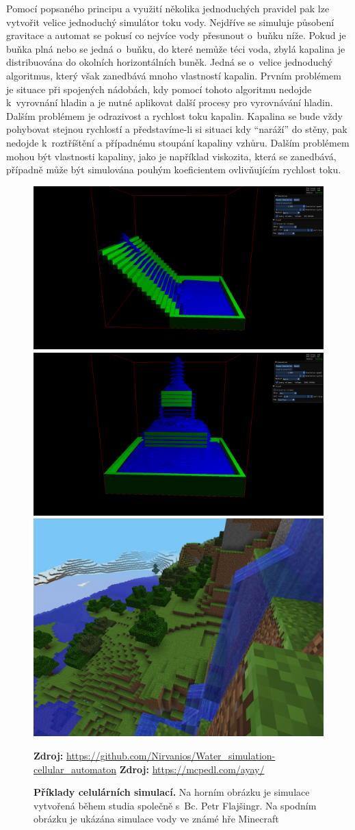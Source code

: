 Pomocí popsaného principu a využití několika jednoduchých pravidel pak lze vytvořit velice jednoduchý simulátor toku vody. Nejdříve se simuluje působení gravitace a automat se pokusí co nejvíce vody přesunout o~buňku níže. Pokud je buňka plná nebo se jedná o~buňku, do které nemůže téci voda, zbylá kapalina je distribuována do okolních horizontálních buněk. Jedná se o~velice jednoduchý algoritmus, který však zanedbává mnoho vlastností kapalin. Prvním problémem je situace při spojených nádobách, kdy pomocí tohoto algoritmu nedojde k~vyrovnání hladin a je nutné aplikovat další procesy pro vyrovnávání hladin. Dalším problémem je odrazivost a rychlost toku kapalin. Kapalina se bude vždy pohybovat stejnou rychlostí a představíme-li si situaci kdy \enquote{naráží} do stěny, pak nedojde k~roztříštění a případnému stoupání kapaliny vzhůru. Dalším problémem mohou být vlastnosti kapaliny, jako je například viskozita, která se zanedbává, případně může být simulována pouhým koeficientem ovlivňujícím rychlost toku. \cite{Medvecky-Heretik2018thesis}

\begin{figure}[h!]\centering
	\centering
	\captionsetup{justification=centering}
	\includegraphics[width=0.5\linewidth]{obrazky-figures/cellular1.png}\hfill
	\includegraphics[width=0.5\linewidth]{obrazky-figures/cellular2.png}\hfill
	\includegraphics[width=0.5\linewidth]{obrazky-figures/miecraft.jpg}\hfill
	\caption{\textbf{Příklady celulárních simulací.} Na horním obrázku je simulace vytvořená během studia společně s~Bc. Petr Flajšingr. Na spodním obrázku je ukázána simulace vody ve známé hře Minecraft}
	\textbf{Zdroj: } \url{https://github.com/Nirvanios/Water_simulation-cellular_automaton} 
	\textbf{Zdroj: } \url{https://mcpedl.com/ayay/}
	\label{fig:SWE}
\end{figure}

